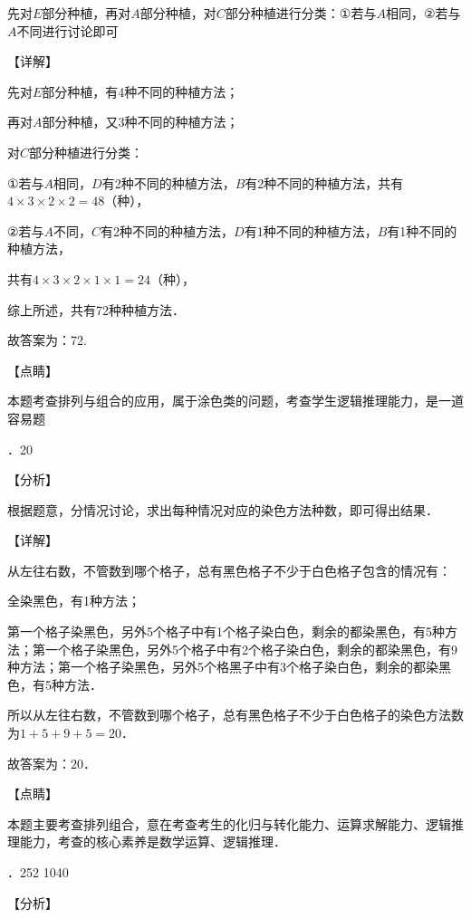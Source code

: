 \noindent 先对$E$部分种植，再对$A$部分种植，对$C$部分种植进行分类：$\mathrm{\textrm{①}}$若与$A$相同，$\mathrm{\textrm{②}}$若与$A$不同进行讨论即可

\noindent 【详解】

\noindent 先对$E$部分种植，有4种不同的种植方法；

\noindent 再对$A$部分种植，又3种不同的种植方法；

\noindent 对$C$部分种植进行分类：

\noindent $\mathrm{\textrm{①}}$若与$A$相同，$D$有2种不同的种植方法，$B$有2种不同的种植方法，共有$4\times 3\times 2\times 2=48$（种），

\noindent $\mathrm{\textrm{②}}$若与$A$不同，$C$有2种不同的种植方法，$D$有1种不同的种植方法，$B$有1种不同的种植方法，

\noindent 共有$4\times 3\times 2\times 1\times 1=24$（种），

\noindent 综上所述，共有72种种植方法．

\noindent 故答案为：72.

\noindent 【点睛】

\noindent 本题考查排列与组合的应用，属于涂色类的问题，考查学生逻辑推理能力，是一道容易题

．20

\noindent 【分析】

\noindent 根据题意，分情况讨论，求出每种情况对应的染色方法种数，即可得出结果．

\noindent 【详解】

\noindent 从左往右数，不管数到哪个格子，总有黑色格子不少于白色格子包含的情况有：

\noindent 全染黑色，有1种方法；

\noindent 第一个格子染黑色，另外5个格子中有1个格子染白色，剩余的都染黑色，有5种方法；第一个格子染黑色，另外5个格子中有2个格子染白色，剩余的都染黑色，有9种方法；第一个格子染黑色，另外5个格黑子中有3个格子染白色，剩余的都染黑色，有5种方法．

\noindent 所以从左往右数，不管数到哪个格子，总有黑色格子不少于白色格子的染色方法数为$1+5+9+5=20$．

\noindent 故答案为：$20$．

\noindent 【点睛】

\noindent 本题主要考查排列组合，意在考查考生的化归与转化能力、运算求解能力、逻辑推理能力，考查的核心素养是数学运算、逻辑推理．

．252    1040    

\noindent 【分析】

